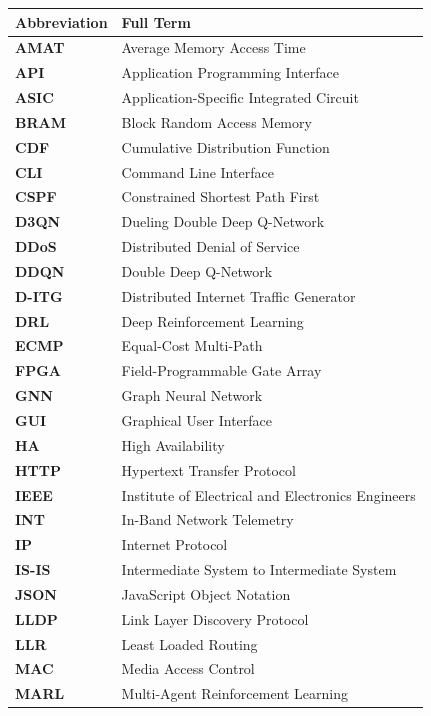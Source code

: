 \documentclass[12pt,a4paper,oneside]{report}
\begin{document}
\begin{table}[htbp]
\centering
\begin{tabularx}{\textwidth}{l X}
\toprule
\textbf{Abbreviation} & \textbf{Full Term} \\
\midrule
\textbf{AMAT} & Average Memory Access Time \\
\textbf{API} & Application Programming Interface \\
\textbf{ASIC} & Application-Specific Integrated Circuit \\
\textbf{BRAM} & Block Random Access Memory \\
\textbf{CDF} & Cumulative Distribution Function \\
\textbf{CLI} & Command Line Interface \\
\textbf{CSPF} & Constrained Shortest Path First \\
\textbf{D3QN} & Dueling Double Deep Q-Network \\
\textbf{DDoS} & Distributed Denial of Service \\
\textbf{DDQN} & Double Deep Q-Network \\
\textbf{D-ITG} & Distributed Internet Traffic Generator \\
\textbf{DRL} & Deep Reinforcement Learning \\
\textbf{ECMP} & Equal-Cost Multi-Path \\
\textbf{FPGA} & Field-Programmable Gate Array \\
\textbf{GNN} & Graph Neural Network \\
\textbf{GUI} & Graphical User Interface \\
\textbf{HA} & High Availability \\
\textbf{HTTP} & Hypertext Transfer Protocol \\
\textbf{IEEE} & Institute of Electrical and Electronics Engineers \\
\textbf{INT} & In-Band Network Telemetry \\
\textbf{IP} & Internet Protocol \\
\textbf{IS-IS} & Intermediate System to Intermediate System \\
\textbf{JSON} & JavaScript Object Notation \\
\textbf{LLDP} & Link Layer Discovery Protocol \\
\textbf{LLR} & Least Loaded Routing \\
\textbf{MAC} & Media Access Control \\
\textbf{MARL} & Multi-Agent Reinforcement Learning \\

\end{tabularx}
\end{table}
\end{document}
